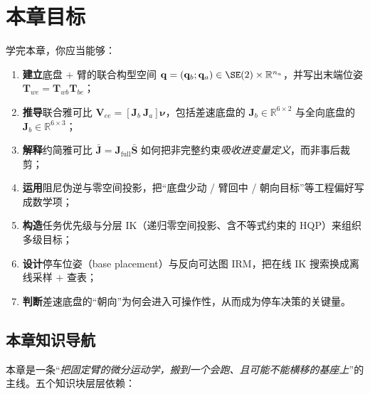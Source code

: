 \section*{本章目标}
学完本章，你应当能够：
\begin{enumerate}
  \item \textbf{建立}底盘 $+$ 臂的联合构型空间 $\mathbf{q}=(\mathbf{q}_b;\mathbf{q}_a)\in\SE(2)\times\mathbb{R}^{n_a}$，并写出末端位姿 $\mathbf{T}_{we}=\mathbf{T}_{wb}\mathbf{T}_{be}$；
  \item \textbf{推导}联合雅可比 $\mathbf{V}_{ee}=[\mathbf{J}_b\ \mathbf{J}_a]\boldsymbol{\nu}$，包括差速底盘的 $\mathbf{J}_b\in\mathbb{R}^{6\times2}$ 与全向底盘的 $\mathbf{J}_b\in\mathbb{R}^{6\times3}$；
  \item \textbf{解释}约简雅可比 $\bar{\mathbf{J}}=\mathbf{J}_{\text{full}}\bar{\mathbf{S}}$ 如何把非完整约束\emph{吸收进变量定义}，而非事后裁剪；
  \item \textbf{运用}阻尼伪逆与零空间投影，把“底盘少动 / 臂回中 / 朝向目标”等工程偏好写成数学项；
  \item \textbf{构造}任务优先级与分层 IK（递归零空间投影、含不等式约束的 HQP）来组织多级目标；
  \item \textbf{设计}停车位姿（base placement）与反向可达图 IRM，把在线 IK 搜索换成离线采样 $+$ 查表；
  \item \textbf{判断}差速底盘的“朝向”为何会进入可操作性，从而成为停车决策的关键量。
\end{enumerate}

\subsection*{本章知识导航}
本章是一条“\emph{把固定臂的微分运动学，搬到一个会跑、且可能不能横移的基座上}”的主线。五个知识块层层依赖：

